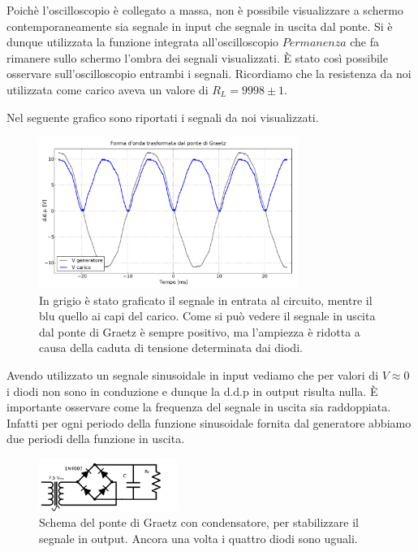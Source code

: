 Poichè l'oscilloscopio è collegato a massa, non è possibile visualizzare a schermo contemporaneamente sia segnale in input che segnale in uscita dal ponte. Si è dunque utilizzata la funzione integrata all'oscilloscopio $Permanenza$ che fa rimanere sullo schermo l'ombra dei segnali visualizzati. \`E stato così possibile osservare sull'oscilloscopio entrambi i segnali. Ricordiamo che la resistenza da noi utilizzata come carico aveva un valore di $R_L=9998 \pm 1$.

Nel seguente grafico sono riportati i segnali da noi visualizzati.

\begin{figure}[h]
\center
	\includegraphics[width=0.75\textwidth]{graetz.pdf}
	\caption{In grigio è stato graficato il segnale in entrata al circuito, mentre il blu quello ai capi del carico. Come si può vedere il segnale in uscita dal ponte di Graetz è sempre positivo, ma l'ampiezza è ridotta a causa della caduta di tensione determinata dai diodi.}
	\label{fig:graetz}
\end{figure}

Avendo utilizzato un segnale sinusoidale in input vediamo che per valori di $V \approx 0$ i diodi non sono in conduzione e dunque la d.d.p in output risulta nulla. \`E importante osservare come la frequenza del segnale in uscita sia raddoppiata. Infatti per ogni periodo della funzione sinusoidale fornita dal generatore abbiamo due periodi della funzione in uscita.\\

\begin{figure}
	\includegraphics[width=0.4\textwidth]{schema_ripple.pdf}
	\caption{Schema del ponte di Graetz con condensatore, per stabilizzare il segnale in output. Ancora una volta i quattro diodi sono uguali.}
	\label{fig:schema_ripple}
\end{figure}

